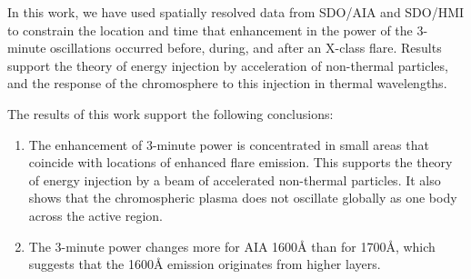 In this work, we have used spatially resolved data from
SDO/AIA and SDO/HMI
to constrain the location and time that enhancement in the power
of the 3-minute oscillations occurred before, during, and after
an X-class flare.
Results support the theory of energy
injection by acceleration of non-thermal particles, and the response
of the chromosphere to this injection in thermal wavelengths.

The results of this work support the following conclusions:
\begin{enumerate}
    \item The enhancement of 3-minute
        power is concentrated in small areas that coincide with locations
        of enhanced flare emission. This supports the theory of
        energy injection by a beam of accelerated non-thermal particles.
        It also shows that the chromospheric plasma does not oscillate
        globally as one body across the active region.
    \item The 3-minute power changes more for
        AIA 1600\AA{} than for 1700\AA{}, which suggests that the 1600\AA{}
        emission originates from higher layers.
\end{enumerate}



